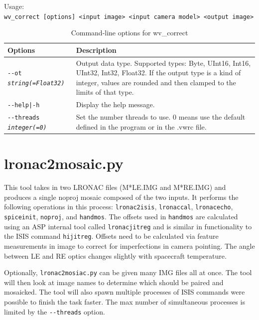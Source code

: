 \medskip

Usage:\\
\hspace*{2em}\texttt{wv\_correct [options] <input image> <input camera model> <output image>}

\medskip

\begin{longtable}{|p{8cm}|p{9cm}|}
\caption{Command-line options for wv\_correct}
\label{tbl:wvcorrect}
\endfirsthead
\endhead
\endfoot
\endlastfoot
\hline
Options & Description \\ \hline \hline
\texttt{-\/-ot \textit{string(=Float32)}} & Output data type. Supported types: Byte, UInt16, Int16, UInt32, Int32, Float32. If the output type is a kind of integer, values are rounded and then clamped to the limits of that type. \\ \hline
\texttt{-\/-help|-h} & Display the help message.\\ \hline
\texttt{-\/-threads \textit{integer(=0)}} & Set the number threads to
use. 0 means use the default defined in the program or in the .vwrc file. \\ \hline
\end{longtable}

\section{lronac2mosaic.py}
\label{lronac2mosaic}

This tool takes in two LRONAC files (M*LE.IMG and M*RE.IMG) and
produces a single noproj mosaic composed of the two inputs.  It
performs the following operations in this process:
\texttt{lronac2isis}, \texttt{lronaccal}, \texttt{lronacecho},
\texttt{spiceinit}, \texttt{noproj}, and \texttt{handmos}. The offsets
used in \texttt{handmos} are calculated using an ASP internal tool
called \texttt{lronacjitreg} and is similar in functionality to the
ISIS command \texttt{hijitreg}. Offsets need to be calculated via
feature measurements in image to correct for imperfections in camera
pointing. The angle between LE and RE optics changes slightly with
spacecraft temperature.

Optionally, \texttt{lronac2mosiac.py} can be given many IMG files all
at once. The tool will then look at image names to determine which
should be paired and mosaicked. The tool will also spawn multiple
processes of ISIS commands were possible to finish the task
faster. The max number of simultaneous processes is limited by the
\texttt{-\/-threads} option.

